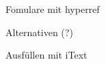 \documentclass{beamer}
\begin{document}
\begin{frame}{Fomulare mit hyperref}
\end{frame}

\begin{frame}{Alternativen (?)}
\end{frame}

\begin{frame}{Ausfüllen mit iText}
\end{frame}
\end{document}
